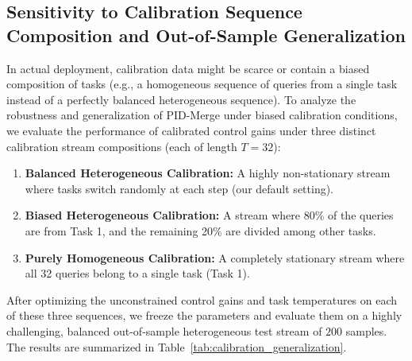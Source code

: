 \subsection{Sensitivity to Calibration Sequence Composition and Out-of-Sample Generalization}
In actual deployment, calibration data might be scarce or contain a biased composition of tasks (e.g., a homogeneous sequence of queries from a single task instead of a perfectly balanced heterogeneous sequence). To analyze the robustness and generalization of PID-Merge under biased calibration conditions, we evaluate the performance of calibrated control gains under three distinct calibration stream compositions (each of length $T = 32$):
\begin{enumerate}
    \item \textbf{Balanced Heterogeneous Calibration:} A highly non-stationary stream where tasks switch randomly at each step (our default setting).
    \item \textbf{Biased Heterogeneous Calibration:} A stream where 80\% of the queries are from Task 1, and the remaining 20\% are divided among other tasks.
    \item \textbf{Purely Homogeneous Calibration:} A completely stationary stream where all 32 queries belong to a single task (Task 1).
\end{enumerate}

After optimizing the unconstrained control gains and task temperatures on each of these three sequences, we freeze the parameters and evaluate them on a highly challenging, balanced out-of-sample heterogeneous test stream of $200$ samples. The results are summarized in Table~\ref{tab:calibration_generalization}.

